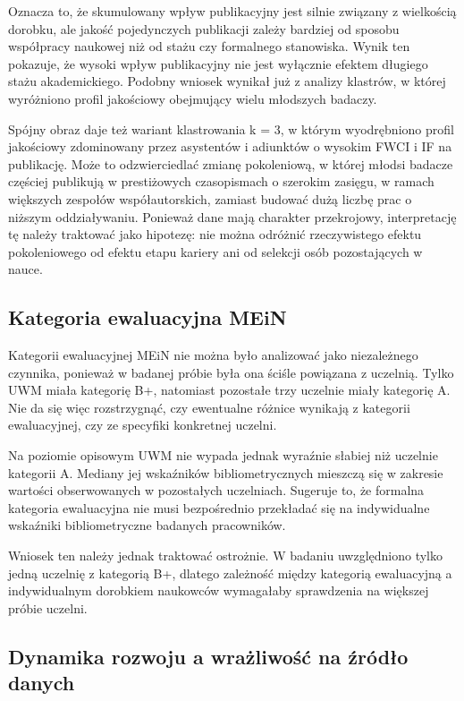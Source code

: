 \documentclass[
  polish,
  12pt,
  a4paper,
]{article}
\begin{document}
Oznacza to, że skumulowany wpływ publikacyjny jest silnie związany z
wielkością dorobku, ale jakość pojedynczych publikacji zależy bardziej
od sposobu współpracy naukowej niż od stażu czy formalnego stanowiska.
Wynik ten pokazuje, że wysoki wpływ publikacyjny nie jest wyłącznie
efektem długiego stażu akademickiego. Podobny wniosek wynikał już z
analizy klastrów, w której wyróżniono profil jakościowy obejmujący wielu
młodszych badaczy.

Spójny obraz daje też wariant klastrowania k = 3, w którym wyodrębniono
profil jakościowy zdominowany przez asystentów i adiunktów o wysokim
FWCI i IF na publikację. Może to odzwierciedlać zmianę pokoleniową, w
której młodsi badacze częściej publikują w prestiżowych czasopismach o
szerokim zasięgu, w ramach większych zespołów współautorskich, zamiast
budować dużą liczbę prac o niższym oddziaływaniu. Ponieważ dane mają
charakter przekrojowy, interpretację tę należy traktować jako hipotezę:
nie można odróżnić rzeczywistego efektu pokoleniowego od efektu etapu
kariery ani od selekcji osób pozostających w nauce.

\subsection{Kategoria ewaluacyjna
MEiN}\label{kategoria-ewaluacyjna-mein}

Kategorii ewaluacyjnej MEiN nie można było analizować jako niezależnego
czynnika, ponieważ w badanej próbie była ona ściśle powiązana z
uczelnią. Tylko UWM miała kategorię B+, natomiast pozostałe trzy
uczelnie miały kategorię A. Nie da się więc rozstrzygnąć, czy ewentualne
różnice wynikają z kategorii ewaluacyjnej, czy ze specyfiki konkretnej
uczelni.

Na poziomie opisowym UWM nie wypada jednak wyraźnie słabiej niż uczelnie
kategorii A. Mediany jej wskaźników bibliometrycznych mieszczą się w
zakresie wartości obserwowanych w pozostałych uczelniach. Sugeruje to,
że formalna kategoria ewaluacyjna nie musi bezpośrednio przekładać się
na indywidualne wskaźniki bibliometryczne badanych pracowników.

Wniosek ten należy jednak traktować ostrożnie. W badaniu uwzględniono
tylko jedną uczelnię z kategorią B+, dlatego zależność między kategorią
ewaluacyjną a indywidualnym dorobkiem naukowców wymagałaby sprawdzenia
na większej próbie uczelni.

\subsection{Dynamika rozwoju a wrażliwość na źródło
danych}\label{dynamika-rozwoju-a-wraux17cliwoux15bux107-na-ux17aruxf3dux142o-danych}
\end{document}
